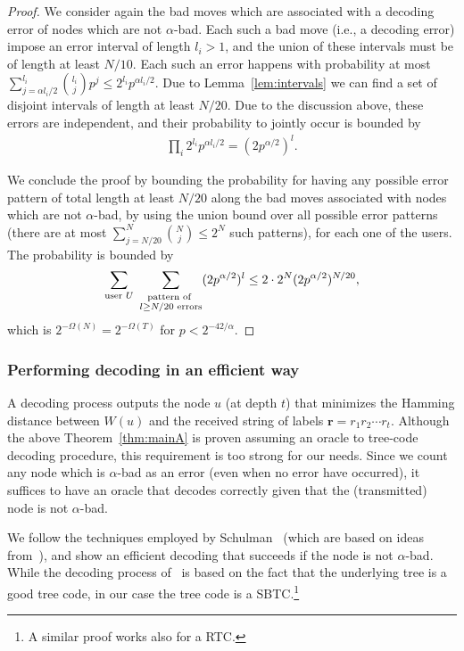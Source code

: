 \documentclass[ letterpaper, 11pt]{article}
\newcommand{\RTBC}{\textsf{RTC}\xspace}
\newcommand{\KTC}{\textsf{SBTC}\xspace}
\begin{document}
\begin{proof}
We consider again the bad moves which are associated with
a decoding error of  nodes which are not $\alpha$-bad. Each such a bad move (i.e., a decoding error)
impose an error interval of length $l_i >1$, and the union of these intervals must be
of length at least $N/10$.
Each such an error happens with probability at most
$\sum_{j=\alpha l_i/2}^{l_i} {{l_i} \choose j} p^j \le 2^{l_i} p^{\alpha l_i/2}$.
Due to Lemma~\ref{lem:intervals} we can find a set of disjoint intervals
of length at least $N/20$. Due to the discussion above, these errors are independent, and their
probability to jointly occur is bounded by
\begin{align*}
 \prod_{i} 2^{l_i} p^{\alpha l_i/2} = (2p^{\alpha/2})^{l}\text{.}
\end{align*}



We conclude the proof by bounding the probability
for having any possible error pattern of total length at least $N/20$
along the bad moves associated with nodes which are not $\alpha$-bad,
by using the union bound
over all possible error patterns (there are
at most $\sum_{j=N/20}^N{N \choose j}\le 2^N$ such patterns),
for each one of the users. The probability is bounded by
$$
\sum_{\text{user } U}\ \sum_{\stackrel{\text{\scriptsize pattern of }}{l\ge N/20 \text{ errors}} }  (2p^{\alpha/2})^{l} \le
2\cdot 2^N (2p^{\alpha/2})^{N/20},
$$
which is $2^{-\Omega (N)}=2^{-\Omega (T)}$ for  $p< 2^{-42/\alpha}$.
\end{proof}


\subsubsection{Performing decoding in an efficient way}\label{sec:eff}


A decoding process outputs the node $u$ (at depth $t$) that minimizes the Hamming distance
between $W(u)$ and the received string of labels ${\mathbf{r}=r_1r_2\dotsm r_t}$.
Although the above Theorem~\ref{thm:mainA} is proven assuming an oracle to
tree-code decoding procedure, this requirement is too strong for our needs.
Since we count any node which is $\alpha$-bad as an error (even when no error have occurred),
it suffices to have an oracle that decodes correctly given that the (transmitted) node
is not $\alpha$-bad.

We follow the techniques
employed by Schulman~\cite{schulman96}
(which are based on ideas from~\cite{wozencraft57, reiffen60, fano63}),
and show an efficient decoding that succeeds if the node is
not $\alpha$-bad.
While the decoding process of~\cite{schulman96} is based on the fact that
the underlying tree is a good tree code,
in our case the tree code is a \KTC.\footnote{A similar proof works also for a \RTBC.}
\end{document}
